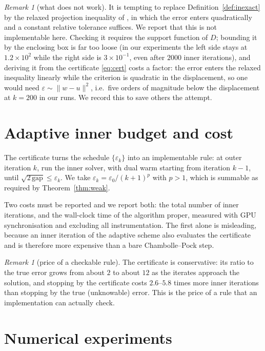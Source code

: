 \documentclass[11pt]{article}
\theoremstyle{plain}
\theoremstyle{definition}
\theoremstyle{remark}
\newtheorem{remark}[theorem]{Remark}
\newcommand{\norm}[1]{\lVert #1 \rVert}
\begin{document}
\begin{remark}[what does not work]
\label{rem:fail}
It is tempting to replace Definition~\ref{def:inexact} by the relaxed
projection inequality of \cite{DiazMillan2024}, in which the error enters
quadratically and a constant relative tolerance suffices. We report that this
is not implementable here. Checking it requires the support function of $D$;
bounding it by the enclosing box is far too loose (in our experiments the left
side stays at $1.2 \times 10^{2}$ while the right side is $3\times10^{-1}$,
even after $2000$ inner iterations), and deriving it from the certificate
\eqref{eq:cert} costs a factor: the error enters the relaxed inequality
linearly while the criterion is quadratic in the displacement, so one would
need $\varepsilon \sim \norm{w-u}^2$, i.e.\ five orders of magnitude below the
displacement at $k=200$ in our runs. We record this to save others the attempt.
\end{remark}

\section{Adaptive inner budget and cost}
\label{sec:cost}

The certificate turns the schedule $\{\varepsilon_k\}$ into an implementable
rule: at outer iteration $k$, run the inner solver, with dual warm starting
from iteration $k-1$, until $\sqrt{2\,\mathrm{gap}} \le \varepsilon_k$. We take
$\varepsilon_k = \varepsilon_0/(k+1)^p$ with $p>1$, which is summable as
required by Theorem~\ref{thm:weak}.

Two costs must be reported and we report both: the total number of inner
iterations, and the wall-clock time of the algorithm proper, measured with GPU
synchronisation and excluding all instrumentation. The first alone is
misleading, because an inner iteration of the adaptive scheme also evaluates
the certificate and is therefore more expensive than a bare Chambolle--Pock
step.

\begin{remark}[price of a checkable rule]
The certificate is conservative: its ratio to the true error grows from about
$2$ to about $12$ as the iterates approach the solution, and stopping by the
certificate costs $2.6$--$5.8$ times more inner iterations than stopping by the
true (unknowable) error. This is the price of a rule that an implementation can
actually check.
\end{remark}

\section{Numerical experiments}
\label{sec:num}
\end{document}
